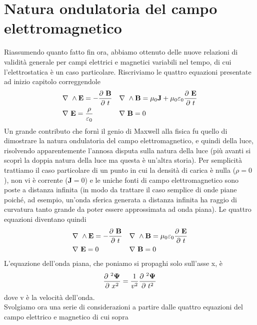 \documentclass[10pt,a4paper]{article}
\def\d{\ensuremath\partial}
\def\d{\ensuremath\partial\ }
\def\n{\ensuremath\nabla}
\def\n{\ensuremath\nabla\ }
\begin{document}
\section{Natura ondulatoria del campo elettromagnetico}
Riassumendo quanto fatto fin ora, abbiamo ottenuto delle nuove relazioni di validità generale per campi elettrici e magnetici variabili nel tempo, di cui l'elettrostatica è un caso particolare. Riscriviamo le quattro equazioni presentate ad inizio capitolo correggendole
\begin{align*}
	&\n\wedge\mathbf{E}=-\frac{\d \mathbf{B}}{\d t}&&\n\wedge\mathbf{B}=\mu_0\mathbf{J}+\mu_0\varepsilon_0\frac{\d \mathbf{E}}{\d t}\\
	&\n\mathbf{E}=\frac{\rho}{\varepsilon_0}&&\n\mathbf{B}=0
\end{align*}
Un grande contributo che fornì il genio di Maxwell alla fisica fu quello di dimostrare la natura ondulatoria del campo elettromagnetico, e quindi della luce, risolvendo apparentemente l'annosa disputa sulla natura della luce (più avanti si scoprì la doppia natura della luce ma questa è un'altra storia). Per semplicità trattiamo il caso particolare di un punto in cui la densità di carica è nulla ($\rho = 0$), non vi è corrente (\(\mathbf{J}=0\)) e le uniche fonti di campo elettromagnetico sono poste a distanza infinita (in modo da trattare il caso semplice di onde piane poiché, ad esempio, un'onda sferica generata a distanza infinita ha raggio di curvatura tanto grande da poter essere approssimata ad onda piana). Le quattro equazioni diventano quindi
\begin{align*}
	&\n\wedge\mathbf{E}=-\frac{\d \mathbf{B}}{\d t}&&\n\wedge\mathbf{B}=\mu_0\varepsilon_0\frac{\d \mathbf{E}}{\d t}\\
	&\n\mathbf{E}=0&&\n\mathbf{B}=0
\end{align*}
 L'equazione dell'onda piana, che poniamo si propaghi solo sull'asse x, è
\[\frac{\d^2 \mathbf{\Psi}}{\d x^2} = \frac{1}{v^2}\frac{\d^2 \mathbf{\Psi}}{\d t^2}\]
dove v è la velocità dell'onda.\\
Svolgiamo ora una serie di considerazioni a partire dalle quattro equazioni del campo elettrico e magnetico di cui sopra 
\end{document}
